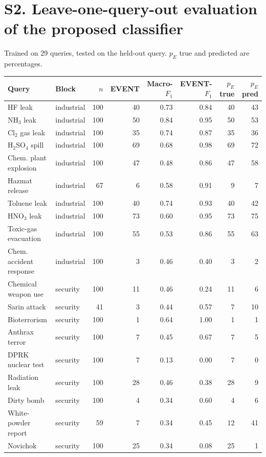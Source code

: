 \documentclass[11pt]{article}
\begin{document}
\section*{S2. Leave-one-query-out evaluation of the proposed classifier}
Trained on 29 queries, tested on the held-out query. $p_E$ true and predicted are percentages.\\[4pt]
{\footnotesize\setlength{\tabcolsep}{4pt}
\begin{tabular}{llrrrrrr}\toprule Query & Block & $n$ & EVENT & Macro-$F_1$ & EVENT-$F_1$ & $p_E$ true & $p_E$ pred \\\midrule
HF leak & industrial & 100 & 40 & 0.73 & 0.84 & 40 & 43 \\
NH$_3$ leak & industrial & 100 & 50 & 0.84 & 0.95 & 50 & 53 \\
Cl$_2$ gas leak & industrial & 100 & 35 & 0.74 & 0.87 & 35 & 36 \\
H$_2$SO$_4$ spill & industrial & 100 & 69 & 0.68 & 0.98 & 69 & 72 \\
Chem. plant explosion & industrial & 100 & 47 & 0.48 & 0.86 & 47 & 58 \\
Hazmat release & industrial & 67 & 6 & 0.58 & 0.91 & 9 & 7 \\
Toluene leak & industrial & 100 & 40 & 0.74 & 0.93 & 40 & 42 \\
HNO$_3$ leak & industrial & 100 & 73 & 0.60 & 0.95 & 73 & 75 \\
Toxic-gas evacuation & industrial & 100 & 55 & 0.53 & 0.86 & 55 & 63 \\
Chem. accident response & industrial & 100 & 3 & 0.46 & 0.40 & 3 & 2 \\
Chemical weapon use & security & 100 & 11 & 0.46 & 0.24 & 11 & 6 \\
Sarin attack & security & 41 & 3 & 0.44 & 0.57 & 7 & 10 \\
Bioterrorism & security & 100 & 1 & 0.64 & 1.00 & 1 & 1 \\
Anthrax terror & security & 100 & 7 & 0.45 & 0.67 & 7 & 5 \\
DPRK nuclear test & security & 100 & 7 & 0.13 & 0.00 & 7 & 0 \\
Radiation leak & security & 100 & 28 & 0.46 & 0.38 & 28 & 9 \\
Dirty bomb & security & 100 & 4 & 0.34 & 0.60 & 4 & 6 \\
White-powder report & security & 59 & 7 & 0.34 & 0.45 & 12 & 41 \\
Novichok & security & 100 & 25 & 0.34 & 0.08 & 25 & 1 \\

\end{tabular}}
\end{document}
